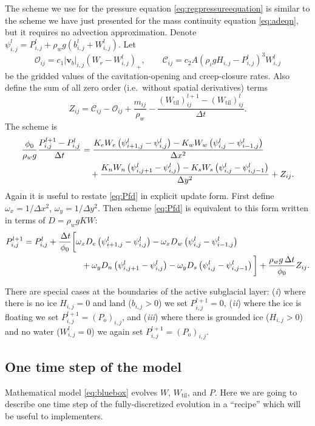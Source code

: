 \documentclass[11pt,final]{amsart}
\newcommand\bv{\mathbf{v}}
\newcommand{\Wtil}{W_{\text{til}}}
\newcommand{\Wlij}{W^l_{i,j}}
\newcommand{\Plij}{P^l_{i,j}}
\begin{document}
The scheme we use for the pressure equation \eqref{eq:regpressureequation} is similar to the scheme we have just presented for the mass continuity equation \eqref{eq:adeqn}, but it requires no advection approximation.  Denote $\psi_{i,j}^l = P_{i,j}^l + \rho_w g (b_{i,j}^l + W_{i,j}^l)$.  Let
	$$\mathcal{O}_{ij} = c_1 |\bv_b|_{i,j} \left(W_r - \Wlij\right)_+, \qquad \mathcal{C}_{ij} = c_2 A \left(\rho_i g H_{i,j} - \Plij\right)^3 \Wlij$$
be the gridded values of the cavitation-opening and creep-closure rates.  Also define the sum of all zero order (i.e.~without spatial derivatives) terms
    $$Z_{ij} = \mathcal{C}_{ij} - \mathcal{O}_{ij} + \frac{m_{ij}}{\rho_w} - \frac{(\Wtil)_{ij}^{l+1} - (\Wtil)_{ij}^l}{\Delta t}.$$
The scheme is
\begin{align}
\frac{\phi_0}{\rho_w g} \frac{P_{i,j}^{l+1} - \Plij}{\Delta t} &= \frac{K_e W_e \left(\psi_{i+1,j}^l - \psi_{i,j}^l\right) - K_w W_w \left(\psi_{i,j}^l - \psi_{i-1,j}^l\right)}{\Delta x^2}  \label{eq:Pfd} \\
      &\quad + \frac{K_n W_n \left(\psi_{i,j+1}^l - \psi_{i,j}^l\right) - K_s W_s \left(\psi_{i,j}^l - \psi_{i,j-1}^l\right)}{\Delta y^2} + Z_{ij}. \notag
\end{align}
Again it is useful to restate \eqref{eq:Pfd} in explicit update form.  First define $\omega_x = 1/\Delta x^2$, $\omega_y = 1/\Delta y^2$.   Then scheme \eqref{eq:Pfd} is equivalent to this form written in terms of $D=\rho_w g K W$:
\begin{align}
P_{i,j}^{l+1} = \Plij &+  \frac{\,\Delta t}{\phi_0} \bigg[\omega_x D_e \left(\psi_{i+1,j}^l - \psi_{i,j}^l\right) - \omega_x D_w \left(\psi_{i,j}^l - \psi_{i-1,j}^l\right) \label{eq:Pfdupdate} \\
      &\qquad\qquad + \omega_y D_n \left(\psi_{i,j+1}^l - \psi_{i,j}^l\right) - \omega_y D_s \left(\psi_{i,j}^l - \psi_{i,j-1}^l\right)\bigg] + \frac{\rho_w g\,\Delta t}{\phi_0} Z_{ij}. \notag
\end{align}

There are special cases at the boundaries of the active subglacial layer: (\emph{i}) where there is no ice $H_{i,j}=0$ and land ($b_{i,j}>0$) we set $P_{i,j}^{l+1}=0$, (\emph{ii}) where the ice is floating we set $P_{i,j}^{l+1}=(P_o)_{i,j}$, and (\emph{iii}) where there is grounded ice ($H_{i,j}>0$) and no water ($W_{i,j}^l=0$) we again set $P_{i,j}^{l+1}=(P_o)_{i,j}$. 

\subsection*{One time step of the model}  Mathematical model \eqref{eq:bluebox} evolves $W$, $\Wtil$, and $P$.  Here we are going to describe one time step of the fully-discretized evolution in a ``recipe'' which will be useful to implementers.
\end{document}
